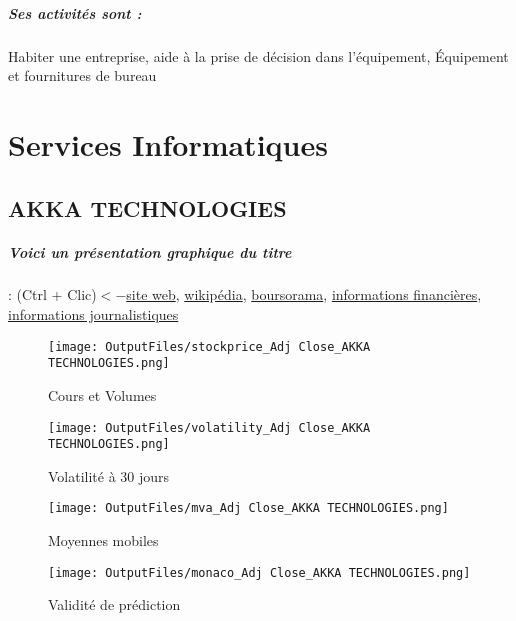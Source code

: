 \documentclass[11pt,a4paper]{report}%
\begin{document}
\paragraph{Ses activités sont : } Habiter une entreprise, aide à la prise de décision dans l’équipement, Équipement et fournitures de bureau 
    
    \newpage\chapter{Services Informatiques}


\section{AKKA TECHNOLOGIES}

\paragraph{Voici un présentation graphique du titre} : (Ctrl + Clic)$<-$\href{https://www.akka-technologies.com/investors/?lang=fr}{site web}, \href{https://fr.wikipedia.org/wiki/Akka_Technologies}{wikipédia}, \href{https://www.boursorama.com/cours/1rPAKA}{boursorama}, \href{https://www.qwant.com/?q=site:https:%2f%2fwww.easybourse.com%2faction-societe%2fAKKA-TECHNOLOGIES&t=web&client=ext-firefox-hp}{informations financières}, \href{https://bourse.lerevenu.com/cours-de-bourse/fiche-valeur-synthese/AKKA-TECHNOLOGIES/AKA-FR}{informations journalistiques}
\begin{figure}[!htb]
   \begin{minipage}{0.5\textwidth}
     \centering
     \texttt{[image: OutputFiles/stockprice\_Adj Close\_AKKA TECHNOLOGIES.png]}
     \caption{Cours et Volumes}\label{Fig:price_AKKA TECHNOLOGIES}
   \end{minipage}\hfill
   \begin{minipage}{0.5\textwidth}
     \centering
     \texttt{[image: OutputFiles/volatility\_Adj Close\_AKKA TECHNOLOGIES.png]}
     \caption{Volatilité à 30 jours}\label{Fig:volat_AKKA TECHNOLOGIES}
   \end{minipage}
\end{figure}
\begin{figure}[!htb]
   \begin{minipage}{0.5\textwidth}
     \centering
     \texttt{[image: OutputFiles/mva\_Adj Close\_AKKA TECHNOLOGIES.png]}
     \caption{Moyennes mobiles}\label{Fig:mva_AKKA TECHNOLOGIES}
   \end{minipage}\hfill
   \begin{minipage}{0.5\textwidth}
     \centering
     \texttt{[image: OutputFiles/monaco\_Adj Close\_AKKA TECHNOLOGIES.png]}
     \caption{Validité de prédiction}\label{Fig:prediction_AKKA TECHNOLOGIES}
   \end{minipage}
\end{figure}
\end{document}
